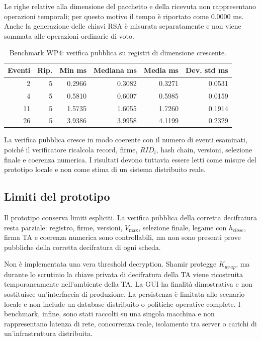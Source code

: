 Le righe relative alla dimensione del pacchetto e della ricevuta non rappresentano operazioni temporali; per questo motivo il tempo \`e riportato come $0.0000$ ms. Anche la generazione delle chiavi RSA \`e misurata separatamente e non viene sommata alle operazioni ordinarie di voto.

\begin{table}[H]
\centering
\begin{tabular}{r r r r r r}
\toprule
\textbf{Eventi} & \textbf{Rip.} & \textbf{Min ms} & \textbf{Mediana ms} & \textbf{Media ms} & \textbf{Dev. std ms} \\
\midrule
2  & 5 & 0.2966 & 0.3082 & 0.3271 & 0.0531 \\
4  & 5 & 0.5810 & 0.6007 & 0.5985 & 0.0159 \\
11 & 5 & 1.5735 & 1.6055 & 1.7260 & 0.1914 \\
26 & 5 & 3.9386 & 3.9958 & 4.1199 & 0.2329 \\
\bottomrule
\end{tabular}
\caption{Benchmark WP4: verifica pubblica su registri di dimensione crescente.}
\label{wp4:tab-benchmark-verifica-pubblica}
\end{table}

La verifica pubblica cresce in modo coerente con il numero di eventi esaminati, poich\'e il verificatore ricalcola record, firme, $\mathit{RID}_i$, hash chain, versioni, selezione finale e coerenza numerica. I risultati devono tuttavia essere letti come misure del prototipo locale e non come stima di un sistema distribuito reale.

\subsection{Limiti del prototipo}
\label{wp4:limiti}

Il prototipo conserva limiti espliciti. La verifica pubblica della corretta decifratura resta parziale: registro, firme, versioni, $V_{\max}$, selezione finale, legame con $h_{\mathit{close}}$, firma TA e coerenza numerica sono controllabili, ma non sono presenti prove pubbliche della corretta decifratura di ogni scheda.

Non \`e implementata una vera threshold decryption. Shamir protegge $K_{\mathit{wrap}}$, ma durante lo scrutinio la chiave privata di decifratura della TA viene ricostruita temporaneamente nell'ambiente della TA. La GUI ha finalit\`a dimostrativa e non sostituisce un'interfaccia di produzione. La persistenza \`e limitata allo scenario locale e non include un database distribuito o politiche operative complete. I benchmark, infine, sono stati raccolti su una singola macchina e non rappresentano latenza di rete, concorrenza reale, isolamento tra server o carichi di un'infrastruttura distribuita.

